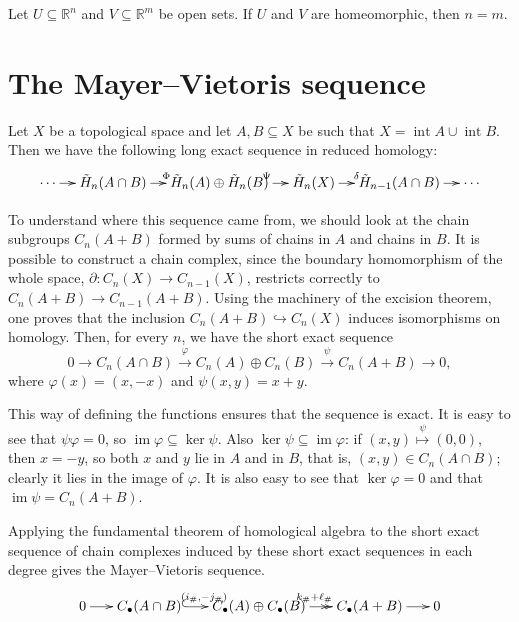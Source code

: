 \begin{theorem}
Let $U\subseteq\mathbb{R}^n$ and
$V\subseteq\mathbb{R}^m$ be open sets. If
$U$ and $V$ are homeomorphic, then $n=m$.
\end{theorem}
\section{The Mayer--Vietoris sequence}
\label{section-mayer-vietoris}

Let $X$ be a topological space and let
$A,B\subseteq X$ be
such that $X=\operatorname{int}
A\cup\operatorname{int} B$. Then we have the
following
long exact sequence in reduced homology:
$$
\xymatrix@C=1.1em{
\cdots \ar[r]
 & \tilde H_n(A\cap B) \ar[r]^{\Phi}
 & \tilde H_n(A)\oplus\tilde H_n(B)
   \ar[r]^{\Psi}
 & \tilde H_n(X) \ar[r]^{\delta}
 & \tilde H_{n-1}(A\cap B) \ar[r]
 & \cdots
}
$$

To understand where this sequence came from,
we should look
at the chain subgroups $C_n(A+B)$ formed by
sums of chains in
$A$ and chains in $B$. It is possible to
construct a chain
complex, since the boundary homomorphism of
the whole space,
$\partial:C_n(X)\to C_{n-1}(X)$, restricts
correctly to
$C_n(A+B)\to C_{n-1}(A+B)$. Using the
machinery of the
excision theorem, one proves that the
inclusion
$C_n(A+B)\hookrightarrow C_n(X)$ induces
isomorphisms on
homology. Then, for every $n$, we have the
short exact
sequence
$$
0\to C_n(A\cap B)\xrightarrow{\varphi}
C_n(A)\oplus
C_n(B)\xrightarrow{\psi}C_n(A+B)\to0,
$$
where $\varphi(x)=(x,-x)$ and
$\psi(x,y)=x+y$.

This way of defining the functions ensures
that the sequence
is exact. It is easy to see that
$\psi\varphi=0$, so
$\operatorname{im}\varphi\subseteq\ker\psi$.
Also
$\ker\psi\subseteq\operatorname{im}\varphi$:
if
$(x,y)\overset{\psi}{\mapsto}(0,0)$, then
$x=-y$, so both
$x$ and $y$ lie in $A$ and in $B$, that is,
$(x,y)\in C_n(A\cap B)$; clearly it lies in
the image of
$\varphi$. It is also easy to see that
$\ker\varphi=0$ and
that $\operatorname{im}\psi=C_n(A+B)$.

Applying the fundamental theorem of
homological algebra to
the short exact sequence of chain complexes
induced by these
short exact sequences in each degree gives
the Mayer--Vietoris
sequence.
$$
\xymatrix@C=1.6em{
0 \ar[r]
 & C_\bullet(A\cap B)
   \ar@{^{(}->}[r]^{(i_\#,-j_\#)}
 & C_\bullet(A)\oplus C_\bullet(B)
   \ar@{->>}[r]^{k_\#+\ell_\#}
 & C_\bullet(A+B) \ar[r]
 & 0
}
$$

